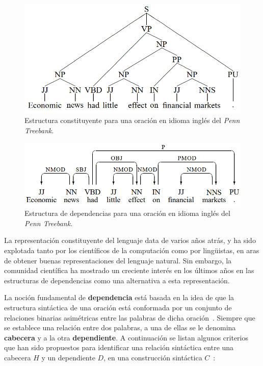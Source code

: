 \begin{figure}[h!]
	\centering
	\includegraphics[width=0.8\linewidth]{Graphics/dep_const.png}
	\caption{Estructura constituyente para una oración en idioma inglés del \emph{Penn Treebank}.}\label{fig:dep_const}
\end{figure}

\begin{figure}[h!]
	\centering
	\includegraphics[width=0.8\linewidth]{Graphics/dep_links.png}
	\caption{Estructura de dependencias para una oración en idioma inglés del \emph{Penn Treebank}.}\label{fig:dep_links}
\end{figure}

La representación constituyente del lenguaje data de varios años atrás, y ha sido explotada tanto por los científicos de la computación como por lingüistas, en aras de obtener buenas representaciones del lenguaje natural.
Sin embargo, la comunidad científica ha mostrado un creciente interés en los últimos años en las estructuras de dependencias como una alternativa a esta representación.

La noción fundamental de \textbf{dependencia} está basada en la idea de que la estructura sintáctica de una oración está conformada por un conjunto de relaciones binarias asimétricas entre las palabras de dicha oración~\cite{nivre2005dependency}.
Siempre que se establece una relación entre dos palabras, a una de ellas se le denomina \textbf{cabecera} y a la otra \textbf{dependiente}.
A continuación se listan algunos criterios que han sido propuestos para identificar una relación sintáctica entre una cabecera $H$ y un dependiente $D$, en una construcción sintáctica $C$~\cite{zwicky1985heads, richard1990english}:


